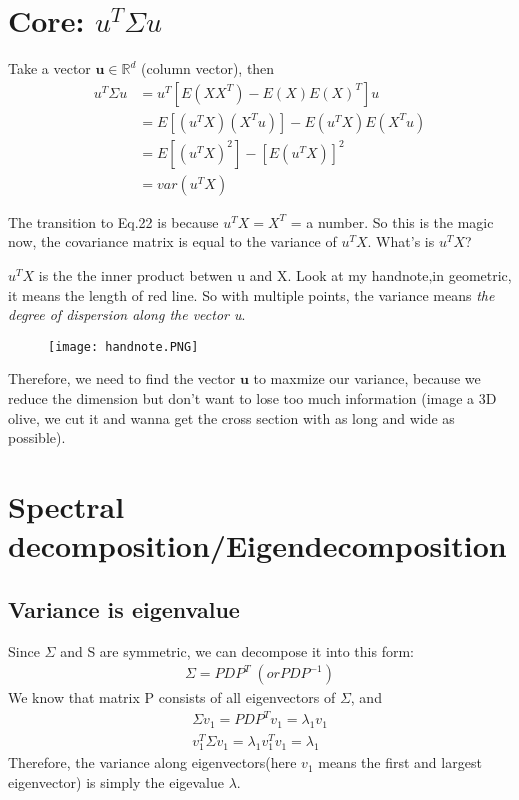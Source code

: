 \documentclass[11pt]{article}
\begin{document}
\section{Core: $u^T\Sigma u$}

Take a vector $\bm{u} \in \mathbb{R}^d$ (column vector), then
\begin{align}
  u^T\Sigma u & = u^T[E(XX^T) - E(X)E(X)^T]u\\
  & = E[(u^TX)(X^Tu)] - E(u^TX)E(X^Tu)\\
  & = E[(u^TX)^2] - [E(u^TX)]^2\\
  & = var(u^TX)
\end{align}

The transition to Eq.22 is because $u^TX = X^T$ = a number.
So this is the magic now, the covariance matrix is equal to the variance of $u^TX$. What's is $u^TX$?

$u^TX$ is the the inner product betwen u and X. Look at my handnote,in geometric, it means the length of red line. So with multiple points, the variance means \emph{the degree of dispersion along the vector u}.

\begin{figure}[hb!]
  \texttt{[image: handnote.PNG]}
\end{figure}

Therefore, we need to find the vector $\bm{u}$ to maxmize our variance, because we reduce the dimension but don't want to lose too much information (image a 3D olive, we cut it and wanna get the cross section with as long and wide as possible).

\section{Spectral decomposition/Eigendecomposition}
\subsection{Variance is eigenvalue}
Since $\Sigma$ and S are symmetric, we can decompose it into this form:
\begin{align}
  \Sigma = PDP^{T} \; (or PDP^{-1})
\end{align}
We know that matrix P consists of all eigenvectors of $\Sigma$, and 
\begin{align}
  \Sigma v_1 = PDP^Tv_1=\lambda_1v_1\\
  v_1^T\Sigma v_1 = \lambda_1v_1^Tv_1=\lambda_1
\end{align}
Therefore, the variance along eigenvectors(here $v_1$ means the first and largest eigenvector) is simply the eigevalue $\lambda$.
\end{document}
